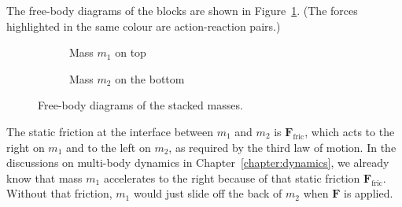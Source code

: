 The free-body diagrams of the blocks are shown in Figure~\ref{stacked-fbd}.
(The forces highlighted in the same colour are action-reaction pairs.)
\begin{figure}[ht]
  \centering
  \begin{subfigure}{.35\linewidth}
    \centering
    \caption{Mass $m_1$ on top}
  \end{subfigure}
  \begin{subfigure}{.35\linewidth}
    \centering
    \caption{Mass $m_2$ on the bottom}
  \end{subfigure}
  \caption{Free-body diagrams of the stacked masses.}
  \label{stacked-fbd}
\end{figure}
The static friction at the interface between $m_1$ and $m_2$ is
$\bm F_\text{fric}$, which acts to the right on $m_1$ and to the left on $m_2$,
as required by the third law of motion. In the discussions on multi-body
dynamics in Chapter~\ref{chapter:dynamics}, we already know that mass $m_1$
accelerates to the right because of that static friction $\bm F_\text{fric}$.
Without that friction, $m_1$ would just slide off the back of $m_2$ when $\bm F$
is applied.

